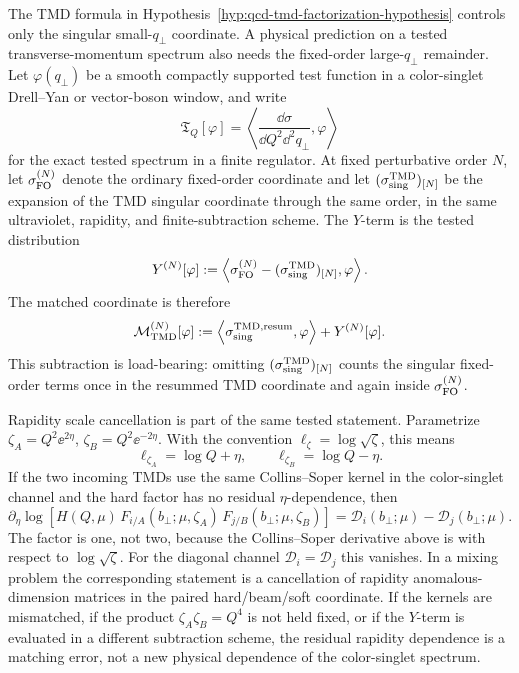 \begin{controlledapproximation}
\label{ca:qcd-tmd-y-term-matching-window}
The TMD formula in
Hypothesis~\ref{hyp:qcd-tmd-factorization-hypothesis} controls only the
singular small-\(q_\perp\) coordinate.  A physical prediction on a tested
transverse-momentum spectrum also needs the fixed-order large-\(q_\perp\)
remainder.  Let \(\varphi(q_\perp)\) be a smooth compactly supported test
function in a color-singlet Drell--Yan or vector-boson window, and write
\[
  \mathfrak T_Q[\varphi]
  =
  \left\langle
    \frac{\dd\sigma}{\dd Q^2\dd^2q_\perp},
    \varphi
  \right\rangle
\]
for the exact tested spectrum in a finite regulator.  At fixed perturbative
order \(N\), let \(\sigma_{\rm FO}^{(N)}\) denote the ordinary fixed-order
coordinate and let
\((\sigma_{\rm sing}^{\rm TMD})_{[N]}\) be the expansion of the TMD singular
coordinate through the same order, in the same ultraviolet, rapidity, and
finite-subtraction scheme.  The \(Y\)-term is the tested distribution
\begin{equation}
  Y^{(N)}[\varphi]
  :=
  \left\langle
    \sigma_{\rm FO}^{(N)}
    -
    (\sigma_{\rm sing}^{\rm TMD})_{[N]},
    \varphi
  \right\rangle .
  \label{eq:qcd-tmd-y-term-tested-definition}
\end{equation}
The matched coordinate is therefore
\begin{equation}
  \mathcal M_{\rm TMD}^{(N)}[\varphi]
  :=
  \left\langle
    \sigma_{\rm sing}^{\rm TMD,resum},
    \varphi
  \right\rangle
  +
  Y^{(N)}[\varphi].
  \label{eq:qcd-tmd-matched-tested-spectrum}
\end{equation}
This subtraction is load-bearing: omitting
\((\sigma_{\rm sing}^{\rm TMD})_{[N]}\) counts the singular fixed-order terms
once in the resummed TMD coordinate and again inside \(\sigma_{\rm FO}^{(N)}\).

Rapidity scale cancellation is part of the same tested statement.  Parametrize
\(\zeta_A=Q^2\ee^{2\eta}\), \(\zeta_B=Q^2\ee^{-2\eta}\).  With the convention
\(\ell_\zeta=\log\sqrt{\zeta}\), this means
\[
  \ell_{\zeta_A}=\log Q+\eta,
  \qquad
  \ell_{\zeta_B}=\log Q-\eta .
\]
If the two incoming TMDs use the same Collins--Soper kernel in the
color-singlet channel and the hard factor has no residual
\(\eta\)-dependence, then
\begin{equation}
  \partial_\eta
  \log\!\left[
    H(Q,\mu)\,
    F_{i/A}(b_\perp;\mu,\zeta_A)\,
    F_{j/B}(b_\perp;\mu,\zeta_B)
  \right]
  =
  \mathcal D_i(b_\perp;\mu)-\mathcal D_j(b_\perp;\mu).
  \label{eq:qcd-tmd-rapidity-split-derivative}
\end{equation}
The factor is one, not two, because the Collins--Soper derivative above is with
respect to \(\log\sqrt{\zeta}\).  For the diagonal channel
\(\mathcal D_i=\mathcal D_j\) this vanishes.  In a mixing problem the
corresponding statement is a cancellation of rapidity anomalous-dimension
matrices in the paired hard/beam/soft coordinate.  If the kernels are
mismatched, if the product \(\zeta_A\zeta_B=Q^4\) is not held fixed, or if the
\(Y\)-term is evaluated in a different subtraction scheme, the residual
rapidity dependence is a matching error, not a new physical dependence of the
color-singlet spectrum.


\end{controlledapproximation}
